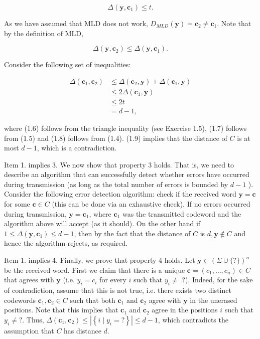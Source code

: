 \documentclass[10pt]{article}
\begin{document}
\begin{equation*}
\Delta\left(\mathbf{y}, \mathbf{c}_{1}\right) \leq t . \tag{1.4}
\end{equation*}


As we have assumed that MLD does not work, $D_{M L D}(\mathbf{y})=\mathbf{c}_{2} \neq \mathbf{c}_{1}$. Note that by the definition of MLD,


\begin{equation*}
\Delta\left(\mathbf{y}, \mathbf{c}_{2}\right) \leq \Delta\left(\mathbf{y}, \mathbf{c}_{1}\right) . \tag{1.5}
\end{equation*}


Consider the following set of inequalities:


\begin{align*}
\Delta\left(\mathbf{c}_{1}, \mathbf{c}_{2}\right) & \leq \Delta\left(\mathbf{c}_{2}, \mathbf{y}\right)+\Delta\left(\mathbf{c}_{1}, \mathbf{y}\right)  \tag{1.6}\\
& \leq 2 \Delta\left(\mathbf{c}_{1}, \mathbf{y}\right)  \tag{1.7}\\
& \leq 2 t  \tag{1.8}\\
& =d-1, \tag{1.9}
\end{align*}


where (1.6) follows from the triangle inequality (see Exercise 1.5), (1.7) follows from (1.5) and (1.8) follows from (1.4). (1.9) implies that the distance of $C$ is at most $d-1$, which is a contradiction.

Item 1. implies 3. We now show that property 3 holds. That is, we need to describe an algorithm that can successfully detect whether errors have occurred during transmission (as long as the total number of errors is bounded by $d-1$ ). Consider the following error detection algorithm: check if the received word $\mathbf{y}=\mathbf{c}$ for some $\mathbf{c} \in C$ (this can be done via an exhaustive check). If no errors occurred during transmission, $\mathbf{y}=\mathbf{c}_{1}$, where $\mathbf{c}_{1}$ was the transmitted codeword and the algorithm above will accept (as it should). On the other hand if $1 \leq \Delta\left(\mathbf{y}, \mathbf{c}_{1}\right) \leq d-1$, then by the fact that the distance of $C$ is $d, \mathbf{y} \notin C$ and hence the algorithm rejects, as required.

Item 1. implies 4. Finally, we prove that property 4 holds. Let $\mathbf{y} \in(\Sigma \cup\{?\})^{n}$ be the received word. First we claim that there is a unique $\mathbf{c}=\left(c_{1}, \ldots, c_{n}\right) \in C$ that agrees with $\mathbf{y}$ (i.e. $y_{i}=c_{i}$ for every $i$ such that $y_{i} \neq$ ?). Indeed, for the sake of contradiction, assume that this is not true, i.e. there exists two distinct codewords $\mathbf{c}_{1}, \mathbf{c}_{2} \in C$ such that both $\mathbf{c}_{1}$ and $\mathbf{c}_{2}$ agree with $\mathbf{y}$ in the unerased positions. Note that this implies that $\mathbf{c}_{1}$ and $\mathbf{c}_{2}$ agree in the positions $i$ such that $y_{i} \neq ?$. Thus, $\Delta\left(\mathbf{c}_{1}, \mathbf{c}_{2}\right) \leq\left|\left\{i \mid y_{i}=?\right\}\right| \leq d-1$, which contradicts the assumption that $C$ has distance $d$.
\end{document}
